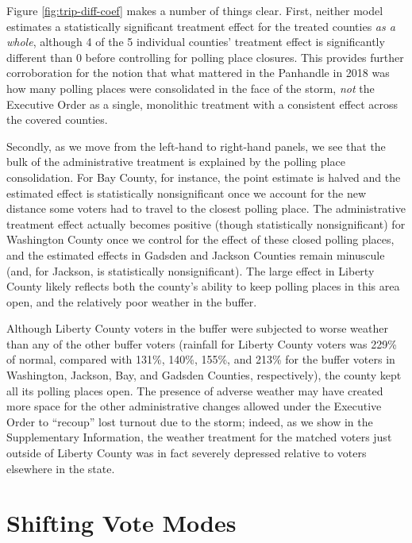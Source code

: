 \documentclass[
  12pt,
]{article}
\begin{document}
Figure \ref{fig:trip-diff-coef} makes a number of things clear. First, neither model estimates a statistically significant treatment effect for the treated counties \emph{as a whole}, although 4 of the 5 individual counties' treatment effect is significantly different than 0 before controlling for polling place closures. This provides further corroboration for the notion that what mattered in the Panhandle in 2018 was how many polling places were consolidated in the face of the storm, \emph{not} the Executive Order as a single, monolithic treatment with a consistent effect across the covered counties.

Secondly, as we move from the left-hand to right-hand panels, we see that the bulk of the administrative treatment is explained by the polling place consolidation. For Bay County, for instance, the point estimate is halved and the estimated effect is statistically nonsignificant once we account for the new distance some voters had to travel to the closest polling place. The administrative treatment effect actually becomes positive (though statistically nonsignificant) for Washington County once we control for the effect of these closed polling places, and the estimated effects in Gadsden and Jackson Counties remain minuscule (and, for Jackson, is statistically nonsignificant). The large effect in Liberty County likely reflects both the county's ability to keep polling places in this area open, and the relatively poor weather in the buffer.

Although Liberty County voters in the buffer were subjected to worse weather than any of the other buffer voters (rainfall for Liberty County voters was 229\% of normal, compared with 131\%, 140\%, 155\%, and 213\% for the buffer voters in Washington, Jackson, Bay, and Gadsden Counties, respectively), the county kept all its polling places open. The presence of adverse weather may have created more space for the other administrative changes allowed under the Executive Order to ``recoup'' lost turnout due to the storm; indeed, as we show in the Supplementary Information, the weather treatment for the matched voters just outside of Liberty County was in fact severely depressed relative to voters elsewhere in the state.

\hypertarget{shifting-vote-modes}{%
\section*{Shifting Vote Modes}\label{shifting-vote-modes}}
\end{document}
